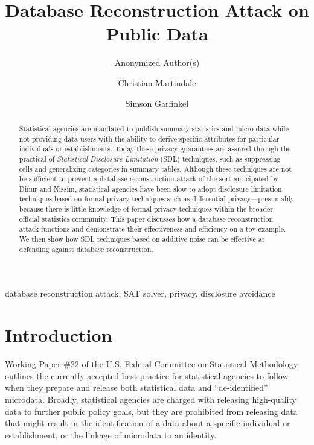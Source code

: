 \documentclass[runningheads]{llncs}
\begin{document}
\title{Database Reconstruction Attack on Public Data}
\ifanonymized
\author{Anonymized Author(s)}
\else
\author{Christian Martindale \and Simson Garfinkel}
\fi

\maketitle
\begin{abstract}
Statistical agencies are mandated to publish summary statistics and
micro data while not providing data users with the ability to derive
specific attributes for particular individuals or
establishments. Today these privacy guarantees are assured through the
practical of \emph{Statistical Disclosure Limitation} (SDL)
techniques, such as suppressing cells and generalizing categories in
summary tables. Although these techniques are not be sufficient to
prevent a database reconstruction attack of the sort anticipated by
Dinur and Nissim\cite{noise}, statistical agencies have been slow to
adopt disclosure limitation techniques based on formal privacy
techniques such as differential privacy---presumably because there is
little knowledge of formal privacy techniques within the broader
official statistics community.  This paper discusses how a database
reconstruction attack functions and demonstrate their effectiveness
and efficiency on a toy example. We then show how SDL techniques based
on additive noise can be effective at defending against database
reconstruction.
\end{abstract}

\begin{keywords}
database reconstruction attack, SAT solver, privacy, disclosure avoidance
\end{keywords}


\section{Introduction}
Working Paper \#22 of the U.S. Federal Committee on Statistical
Methodology\cite{workingpaper22} outlines the currently accepted best
practice for statistical agencies to follow when they prepare and
release both statistical data and ``de-identified''
microdata. Broadly, statistical agencies are charged with releasing
high-quality data to further public policy goals, but they are
prohibited from releasing data that might result in the identification
of a data about a specific individual or establishment, or the linkage
of microdata to an identity.
\end{document}

